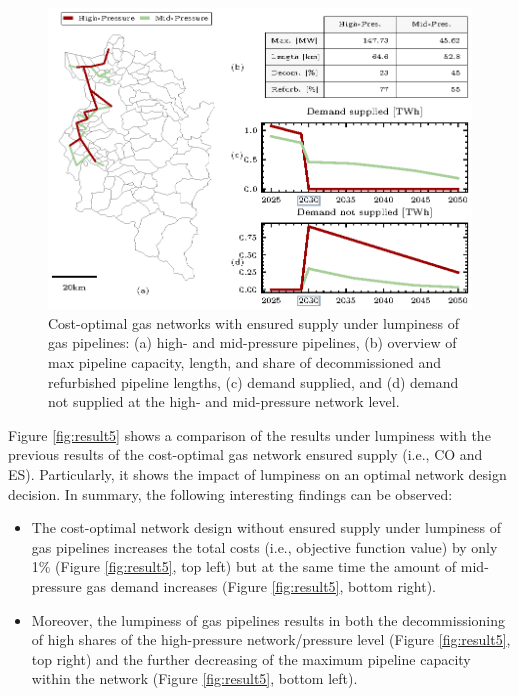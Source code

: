 \begin{figure}[h]
	\centering
	\includegraphics[width=1\linewidth]{figures/lumpiness/network.eps}
	\caption{Cost-optimal gas networks with ensured supply under lumpiness of gas pipelines: (a) high- and mid-pressure pipelines, (b) overview of max pipeline capacity, length, and share of decommissioned and refurbished pipeline lengths, (c) demand supplied, and (d) demand not supplied at the high- and mid-pressure network level.}
	\label{fig:result4}
\end{figure}

Figure \ref{fig:result5} shows a comparison of the results under lumpiness with the previous results of the cost-optimal gas network  ensured supply (i.e., CO and ES). Particularly, it shows the impact of lumpiness on an optimal network design decision. In summary, the following interesting findings can be observed:
\begin{itemize}
	\item The cost-optimal network design without ensured supply under lumpiness of gas pipelines increases the total costs (i.e., objective function value) by only 1\% (Figure \ref{fig:result5}, top left) but at the same time the amount of mid-pressure gas demand increases (Figure \ref{fig:result5}, bottom right).
	\item Moreover, the lumpiness of gas pipelines results in both the decommissioning of high shares of the high-pressure network/pressure level (Figure \ref{fig:result5}, top right) and the further decreasing of the maximum pipeline capacity within the network (Figure \ref{fig:result5}, bottom left).
\end{itemize}

